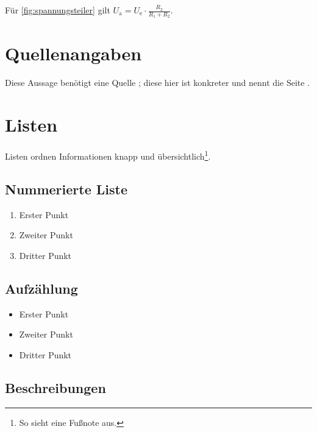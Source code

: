 Für \cref{fig:spannungsteiler} gilt
$U_\mathrm{a} = U_\mathrm{e} \cdot \frac{R_2}{R_1 + R_2}$.


\section{Quellenangaben}

Diese Aussage benötigt eine Quelle \cite{article_key}; diese hier ist
konkreter und nennt die Seite \cite[162]{book_key}.


\section{Listen}

Listen ordnen Informationen knapp und übersichtlich\footnote{So sieht eine
Fußnote aus.}.

\subsection{Nummerierte Liste}

\begin{enumerate}
	\item Erster Punkt
	\item Zweiter Punkt
	\item Dritter Punkt
\end{enumerate}

\subsection{Aufzählung}

\begin{itemize}
	\item Erster Punkt
	\item Zweiter Punkt
	\item Dritter Punkt
\end{itemize}

\subsection{Beschreibungen}

